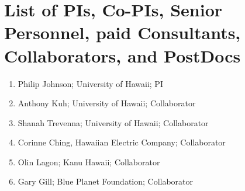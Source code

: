 
\section*{List of PIs, Co-PIs, Senior Personnel, paid Consultants,
  Collaborators, and PostDocs}


\begin{enumerate}
\item Philip Johnson; University of Hawaii; PI
\item Anthony Kuh; University of Hawaii; Collaborator
\item Shanah Trevenna; University of Hawaii; Collaborator
\item Corinne Ching, Hawaiian Electric Company; Collaborator
\item Olin Lagon; Kanu Hawaii; Collaborator
\item Gary Gill; Blue Planet Foundation; Collaborator
\end{enumerate}



